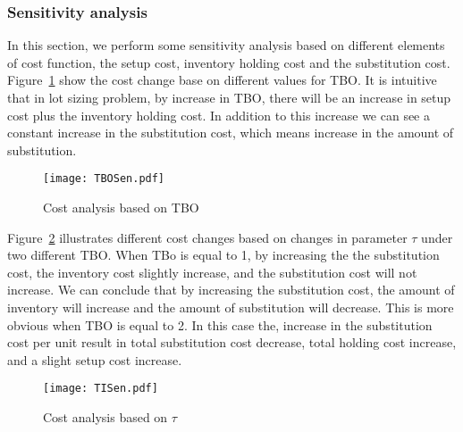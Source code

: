 \documentclass[10pt]{article}
\begin{document}
\subsubsection{Sensitivity analysis}
In this section, we perform some sensitivity analysis based on different elements of cost function, the setup cost, inventory holding cost and the substitution cost. 
Figure~\ref{fig:TBOSen} show the cost change base on different values for TBO. It is intuitive that in lot sizing problem, by increase in TBO, there will be an increase in setup cost plus the inventory holding cost. In addition to this increase we can see a constant increase in the substitution cost, which means increase in the amount of substitution. 

\begin{figure}[!h]
\begin{center}
\texttt{[image: TBOSen.pdf]}
\caption{Cost analysis based on TBO} 
\label{fig:TBOSen}
\end{center}
\end{figure}

Figure~\ref{fig:TISen} illustrates different cost changes based on changes in parameter $\tau$ under two different TBO. When TBo is equal to 1, by increasing the the substitution cost, the inventory cost slightly increase, and the substitution cost will not increase. We can conclude that by increasing the substitution cost, the amount of inventory will increase and the amount of substitution will decrease. This is more obvious when TBO is equal to 2. In this case the, increase in the substitution cost per unit result in total substitution cost decrease, total holding cost increase, and a slight setup cost increase.  

\begin{figure}[H]
\begin{center}
\texttt{[image: TISen.pdf]}
\caption{Cost analysis based on $\tau$} 
\label{fig:TISen}
\end{center}
\end{figure}
\end{document}
